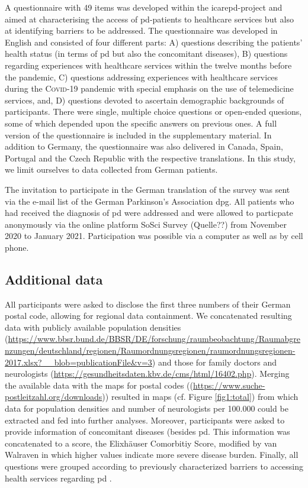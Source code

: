 \documentclass{bmcart}
\begin{document}
A questionnaire with 49 items was developed within the \ac{icarepd}-project and aimed at characterising the access of \ac{pd}-patients to healthcare services but also at identifying barriers to be addressed. The questionnaire was developed in English and consisted of four different parts: A) questions describing the patients' health status (in terms of \ac{pd} but also the concomitant diseases), B) questions regarding experiences with healthcare services within the twelve months before the pandemic, C) questions addressing experiences with healthcare services during the \textsc{Covid}-19 pandemic with special emphasis on the use of telemedicine services, and, D) questions devoted to ascertain demographic backgrounds of participants. There were single, multiple choice questions or open-ended quesions, some of which depended upon the specific answers on previous ones. A full version of the questionnaire is included in the supplementary material. In addition to Germany, the questionnaire was also delivered in Canada, Spain, Portugal and the Czech Republic with the respective translations. In this study, we limit ourselves to data collected from German patients. 

The invitation to participate in the German translation of the survey was sent via the e-mail list of the German Parkinson's Association \ac{dpg}. All patients who had received the diagnosis of \ac{pd} were addressed and were allowed to particpate anonymously via the online platform SoSci Survey (Quelle??) from November 2020 to January 2021. Participation was possible via a computer as well as by cell phone. %

\subsection*{Additional data}
All participants were asked to disclose the first three numbers of their German postal code, allowing for regional data containment. We concatenated resulting data with publicly available population densities (\url{https://www.bbsr.bund.de/BBSR/DE/forschung/raumbeobachtung/Raumabgrenzungen/deutschland/regionen/Raumordnungsregionen/raumordnungsregionen-2017.xlsx?\_\_blob=publicationFile\&v=3}) and those for family doctors and neurologists (\url{https://gesundheitsdaten.kbv.de/cms/html/16402.php}). Merging the available data with the maps for postal codes ((\url{https://www.suche-postleitzahl.org/downloads})) resulted in maps (cf. Figure \ref{fig1:total}) from which data for population densities and number of neurologists per 100.000 could be extracted and fed into further analyses. Moreover, participants were asked to provide information of concomitant diseases (besides \ac{pd}. This information was concatenated to a score, the Elixhäuser Comorbitiy Score, modified by van Walraven \cite{van2009modification} in which higher values indicate more severe disease burden. Finally, all questions were grouped according to previously characterized barriers to accessing health services regarding \ac{pd} \cite{zaman2021barriers}.
\end{document}
